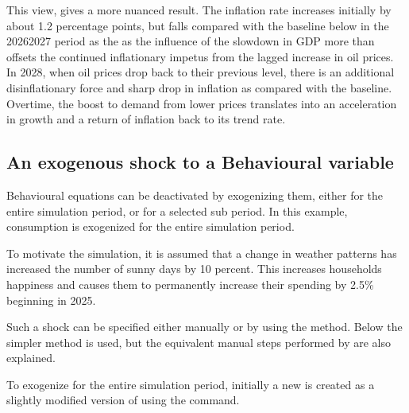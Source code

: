 \documentclass[letterpaper,10pt,english]{jupyterBook}
\begin{document}
\sphinxAtStartPar
This view, gives a more nuanced result.  The inflation rate increases initially by about 1.2 percentage points, but falls compared with the baseline below in the 2026\sphinxhyphen{}2027 period as the as the influence of the slowdown in GDP more than offsets the continued inflationary impetus from the lagged increase in oil prices. In 2028, when oil prices drop back to their previous level, there is an additional dis\sphinxhyphen{}inflationary force and sharp drop in inflation as compared with the baseline. Overtime, the boost to demand from lower prices translates into an acceleration in growth and a return of inflation back to its trend rate.


\subsection{An exogenous shock to a Behavioural variable}
\label{\detokenize{content/05_WBModels/ScenarioAnalysis:an-exogenous-shock-to-a-behavioural-variable}}
\sphinxAtStartPar
Behavioural equations can be de\sphinxhyphen{}activated by exogenizing them, either for the entire simulation period, or for a selected sub period.  In this example, consumption is exogenized for the entire simulation period.

\sphinxAtStartPar
To motivate the simulation, it is assumed that a change in weather patterns has increased the number of sunny days by 10 percent. This increases households happiness and causes them to permanently increase their spending by 2.5\% beginning in 2025.

\sphinxAtStartPar
Such a shock can be specified either manually or by using the method. Below the simpler  method is used, but the equivalent manual steps performed by  are also explained.

\sphinxAtStartPar
To exogenize  for the entire simulation period, initially a new   is created as a slightly modified version of   using the  command.

\sphinxAtStartPar
{}
\end{document}
